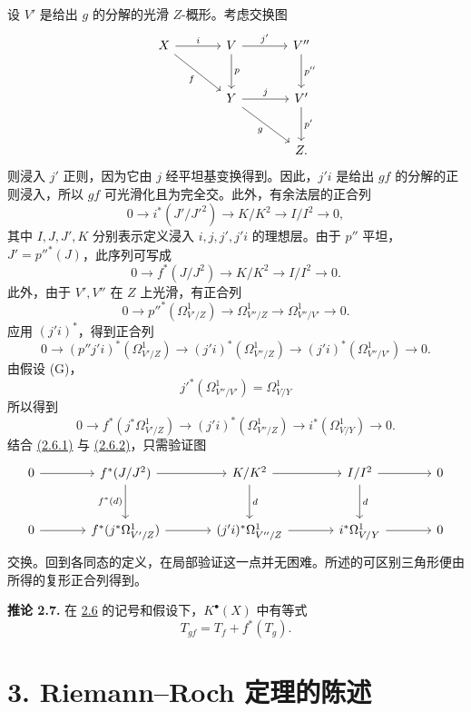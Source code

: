 设 $V'$ 是给出 $g$ 的分解的光滑 $Z$-概形。考虑交换图
\[
\begin{tikzcd}[column sep=large,row sep=large]
X \arrow[r,"i"] \arrow[dr,"f"'] & V \arrow[r,"j'"] \arrow[d,"p"] & V'' \arrow[d,"p''"]\\
& Y \arrow[r,"j"] \arrow[dr,"g"'] & V' \arrow[d,"p'"]\\
& & Z .
\end{tikzcd}
\]
则浸入 $j'$ 正则，因为它由 $j$ 经平坦基变换得到。因此，$j'i$ 是给出 $gf$ 的分解的正则浸入，所以 $gf$ 可光滑化且为完全交。此外，有余法层的正合列
\[
0\longrightarrow i^*(J'/J'^2)\longrightarrow K/K^2\longrightarrow I/I^2\longrightarrow0,
\]
其中 $I,J,J',K$ 分别表示定义浸入 $i,j,j',j'i$ 的理想层。由于 $p''$ 平坦，$J'=p''^*(J)$，此序列可写成
\begin{equation}\tag{2.6.1}
0\longrightarrow f^*(J/J^2)\longrightarrow K/K^2\longrightarrow I/I^2\longrightarrow0.
\end{equation}
此外，由于 $V',V''$ 在 $Z$ 上光滑，有正合列
\[
0\longrightarrow p''^*(\Omega^1_{V'/Z})\longrightarrow\Omega^1_{V''/Z}\longrightarrow\Omega^1_{V''/V'}\longrightarrow0.
\]
应用 $(j'i)^*$，得到正合列
\[
0\longrightarrow (p''j'i)^*(\Omega^1_{V'/Z})\longrightarrow (j'i)^*(\Omega^1_{V''/Z})\longrightarrow (j'i)^*(\Omega^1_{V''/V'})\longrightarrow0.
\]
由假设 (G)，
\[
j'^*(\Omega^1_{V''/V'})=\Omega^1_{V/Y}
\]
所以得到
\begin{equation}\tag{2.6.2}
0\longrightarrow f^*(j^*\Omega^1_{V'/Z})\longrightarrow (j'i)^*(\Omega^1_{V''/Z})\longrightarrow i^*(\Omega^1_{V/Y})\longrightarrow0.
\end{equation}
结合 \hyperlink{sga6.e08.eq.2-6-1}{(2.6.1)} 与 \hyperlink{sga6.e08.eq.2-6-2}{(2.6.2)}，只需验证图
\[
\begin{tikzcd}[column sep=large,row sep=large]
0 \arrow[r] & f^*(J/J^2) \arrow[r] \arrow[d,"f^*(d)"'] & K/K^2 \arrow[r] \arrow[d,"d"] & I/I^2 \arrow[r] \arrow[d,"d"] & 0\\
0 \arrow[r] & f^*(j^*\Omega^1_{V'/Z}) \arrow[r] & (j'i)^*\Omega^1_{V''/Z} \arrow[r] & i^*\Omega^1_{V/Y} \arrow[r] & 0
\end{tikzcd}
\]
交换。回到各同态的定义，在局部验证这一点并无困难。所述的可区别三角形便由所得的复形正合列得到。

\textbf{推论 2.7.} 在 \hyperlink{sga6.e08.prop.2-6}{2.6} 的记号和假设下，$K^{\bullet}(X)$ 中有等式
\[
T_{gf}=T_f+f^*(T_g).
\]

\section*{3. Riemann--Roch 定理的陈述}

